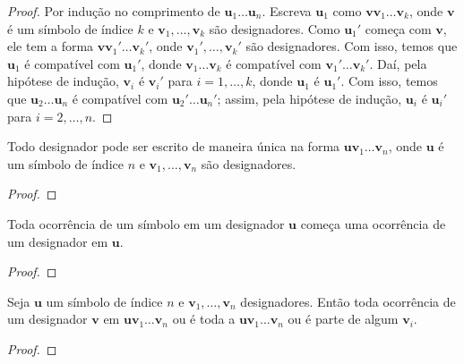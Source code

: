\begin{proof}
    Por indução no comprimento de \( \mathbf{u}_1 \ldots \mathbf{u}_n \). Escreva \( \mathbf{u}_1 \) como \( \mathbf{v} \mathbf{v}_1 \ldots \mathbf{v}_k \), onde \( \mathbf{v} \) é um símbolo de índice \( k \) e \( \mathbf{v}_1, \ldots, \mathbf{v}_k \) são designadores. Como \( \mathbf{u}_1' \) começa com \( \mathbf{v} \), ele tem a forma \( \mathbf{v} \mathbf{v}_1' \ldots \mathbf{v}_k' \), onde \( \mathbf{v}_1', \ldots, \mathbf{v}_k' \) são designadores. Com isso, temos que \( \mathbf{u}_1 \) é compatível com \( \mathbf{u}_1' \), donde \( \mathbf{v}_1 \ldots \mathbf{v}_k \) é compatível com \( \mathbf{v}_1' \ldots \mathbf{v}_k' \). Daí, pela hipótese de indução, \( \mathbf{v}_i \) é \(\mathbf{v}_i' \) para \( i = 1, \ldots, k \), donde \( \mathbf{u}_1 \) é \( \mathbf{u}_1' \). Com isso, temos que \( \mathbf{u}_2 \ldots \mathbf{u}_n \) é compatível com \( \mathbf{u}_2' \ldots \mathbf{u}_n' \); assim, pela hipótese de indução, \( \mathbf{u}_i \) é \( \mathbf{u}_i' \) para \( i = 2, \ldots, n \).
\end{proof}

\begin{theorem}[Formação]
    Todo designador pode ser escrito de maneira única na forma $\mathbf{u} \mathbf{v}_1 \ldots \mathbf{v}_n$, onde $\mathbf{u}$ é um símbolo de índice $n$ e $\mathbf{v}_1, \ldots, \mathbf{v}_n$ são designadores.
\end{theorem}

\begin{proof}
    \blackproof
\end{proof}

\begin{lemma}
    Toda ocorrência de um símbolo em um designador $\mathbf{u}$ começa uma ocorrência de um designador em $\mathbf{u}$.
\end{lemma}

\begin{proof}
    \blackproof
\end{proof}

\begin{theorem}[Ocorrência]
    Seja $\mathbf{u}$ um símbolo de índice $n$ e $\mathbf{v}_1, \ldots, \mathbf{v}_n$ designadores. Então toda ocorrência de um designador $\mathbf{v}$ em $\mathbf{u} \mathbf{v}_1 \ldots \mathbf{v}_n$ ou é toda a $\mathbf{u} \mathbf{v}_1 \ldots \mathbf{v}_n$ ou é parte de algum $\mathbf{v}_i$. 
\end{theorem}

\begin{proof}
    \blackproof
\end{proof}

